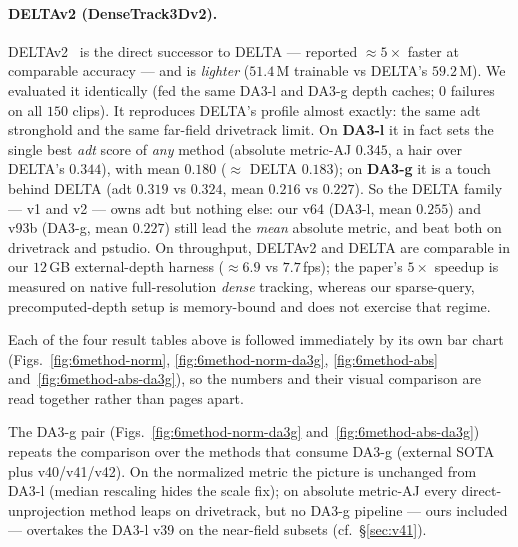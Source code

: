 \documentclass[11pt,a4paper]{article}
\begin{document}
\paragraph{DELTAv2 (DenseTrack3Dv2).}
DELTAv2~\cite{deltav2} is the direct successor to DELTA --- reported ${\approx}5\times$ faster at comparable
accuracy --- and is \emph{lighter} ($51.4$\,M trainable vs DELTA's $59.2$\,M). We evaluated it identically
(fed the same DA3-l and DA3-g depth caches; $0$ failures on all $150$ clips). It reproduces DELTA's profile
almost exactly: the same adt stronghold and the same far-field drivetrack limit. On \textbf{DA3-l} it in fact
sets the single best \emph{adt} score of \emph{any} method (absolute metric-AJ $0.345$, a hair over DELTA's
$0.344$), with mean $0.180$ ($\approx$ DELTA $0.183$); on \textbf{DA3-g} it is a touch behind DELTA
(adt $0.319$ vs $0.324$, mean $0.216$ vs $0.227$). So the DELTA family --- v1 and v2 --- owns adt but nothing
else: our v64 (DA3-l, mean $0.255$) and v93b (DA3-g, mean $0.227$) still lead the \emph{mean} absolute metric,
and beat both on drivetrack and pstudio. On throughput, DELTAv2 and DELTA are comparable in our $12$\,GB
external-depth harness (${\approx}6.9$ vs $7.7$\,fps); the paper's $5\times$ speedup is measured on native
full-resolution \emph{dense} tracking, whereas our sparse-query, precomputed-depth setup is memory-bound and
does not exercise that regime.

Each of the four result tables above is followed immediately by its own bar chart
(Figs.~\ref{fig:6method-norm}, \ref{fig:6method-norm-da3g}, \ref{fig:6method-abs}
and~\ref{fig:6method-abs-da3g}), so the numbers and their visual comparison are read together
rather than pages apart.

The DA3-g pair (Figs.~\ref{fig:6method-norm-da3g} and~\ref{fig:6method-abs-da3g}) repeats the
comparison over the methods that consume DA3-g (external SOTA plus v40/v41/v42). On the
normalized metric the picture is unchanged from DA3-l (median rescaling hides the scale fix); on absolute
metric-AJ every direct-unprojection method leaps on drivetrack, but no DA3-g pipeline --- ours included ---
overtakes the DA3-l v39 on the near-field subsets (cf.\ \S\ref{sec:v41}).
\end{document}
